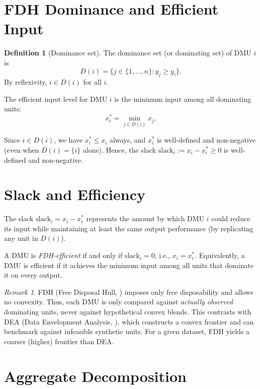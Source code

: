 \documentclass[11pt]{article}
\theoremstyle{definition}
\newtheorem{definition}{Definition}
\theoremstyle{plain}
\theoremstyle{remark}
\newtheorem{remark}{Remark}
\begin{document}
\section{FDH Dominance and Efficient Input}

\begin{definition}[Dominance set]
The dominance set (or dominating set) of DMU $i$ is
\[ D(i) = \{ j \in \{1, \ldots, n\} : y_j \ge y_i \}. \]
By reflexivity, $i \in D(i)$ for all $i$.
\end{definition}

The efficient input level for DMU $i$ is the minimum input among all dominating units:
\begin{equation}
x_i^{*} = \min_{j \in D(i)} x_j.
\end{equation}

Since $i \in D(i)$, we have $x_i^* \le x_i$ always, and $x_i^*$ is well-defined and non-negative (even when $D(i) = \{i\}$ alone).
Hence, the slack $\text{slack}_i := x_i - x_i^* \ge 0$ is well-defined and non-negative.

\section{Slack and Efficiency}

The slack $\text{slack}_i = x_i - x_i^*$ represents the amount by which DMU $i$ could reduce its input while maintaining at least the same output performance (by replicating any unit in $D(i)$).

A DMU is \emph{FDH-efficient} if and only if $\text{slack}_i = 0$, i.e., $x_i = x_i^*$.
Equivalently, a DMU is efficient if it achieves the minimum input among all units that dominate it on every output.

\begin{remark}
FDH (Free Disposal Hull, \cite{DeprinsSimarTulkens1984}) imposes only free disposability and allows no convexity.
Thus, each DMU is only compared against \emph{actually observed} dominating units, never against hypothetical convex blends.
This contrasts with DEA (Data Envelopment Analysis, \cite{CharnesCooperRhodes1978}), which constructs a convex frontier and can benchmark against infeasible synthetic units.
For a given dataset, FDH yields a coarser (higher) frontier than DEA.
\end{remark}

\section{Aggregate Decomposition}
\end{document}
